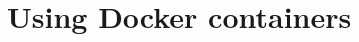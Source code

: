 \documentclass[12pt, a4paper, twoside, openany, titlepage]{book}
\begin{document}







\section{Using Docker containers}
\label{sec:docker-development}
\end{document}
